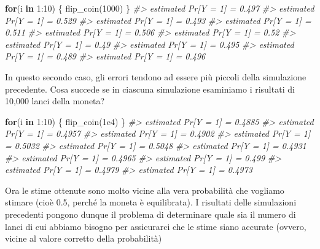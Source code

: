 \documentclass[
  11pt,
]{krantz}
\makeatletter
\newenvironment{Shaded}{\begin{snugshade}}{\end{snugshade}}
\newcommand{\CommentTok}[1]{\textcolor[rgb]{0.37,0.37,0.37}{\textit{#1}}}
\newcommand{\ControlFlowTok}[1]{\textcolor[rgb]{0.27,0.27,0.27}{\textbf{#1}}}
\newcommand{\DecValTok}[1]{\textcolor[rgb]{0.06,0.06,0.06}{#1}}
\newcommand{\FloatTok}[1]{\textcolor[rgb]{0.06,0.06,0.06}{#1}}
\newcommand{\FunctionTok}[1]{\textcolor[rgb]{0,0,0}{#1}}
\newcommand{\NormalTok}[1]{#1}
\newcommand{\SpecialCharTok}[1]{\textcolor[rgb]{0,0,0}{#1}}
\newenvironment{kframe}{%
\medskip{}
\setlength{\fboxsep}{.8em}
 \def\at@end@of@kframe{}%
 \ifinner\ifhmode%
  \def\at@end@of@kframe{\end{minipage}}%
  \begin{minipage}{\columnwidth}%
 \fi\fi%
 \def\FrameCommand##1{\hskip\@totalleftmargin \hskip-\fboxsep
 \colorbox{shadecolor}{##1}\hskip-\fboxsep
     \hskip-\linewidth \hskip-\@totalleftmargin \hskip\columnwidth}%
 \MakeFramed {\advance\hsize-\width
   \@totalleftmargin\z@ \linewidth\hsize
   \@setminipage}}%
 {\par\unskip\endMakeFramed%
 \at@end@of@kframe}
\renewenvironment{Shaded}{\begin{kframe}}{\end{kframe}}
\theoremstyle{definition}
\theoremstyle{definition}
\theoremstyle{definition}
\theoremstyle{definition}
\theoremstyle{remark}
\makeatother
\begin{document}
\begin{Shaded}
\begin{Highlighting}[]
\ControlFlowTok{for}\NormalTok{(i }\ControlFlowTok{in} \DecValTok{1}\SpecialCharTok{:}\DecValTok{10}\NormalTok{) \{}
  \FunctionTok{flip\_coin}\NormalTok{(}\DecValTok{1000}\NormalTok{)}
\NormalTok{\}}
\CommentTok{\#\textgreater{} estimated Pr[Y = 1] = 0.497 }
\CommentTok{\#\textgreater{} estimated Pr[Y = 1] = 0.529 }
\CommentTok{\#\textgreater{} estimated Pr[Y = 1] = 0.493 }
\CommentTok{\#\textgreater{} estimated Pr[Y = 1] = 0.511 }
\CommentTok{\#\textgreater{} estimated Pr[Y = 1] = 0.506 }
\CommentTok{\#\textgreater{} estimated Pr[Y = 1] = 0.52 }
\CommentTok{\#\textgreater{} estimated Pr[Y = 1] = 0.49 }
\CommentTok{\#\textgreater{} estimated Pr[Y = 1] = 0.495 }
\CommentTok{\#\textgreater{} estimated Pr[Y = 1] = 0.489 }
\CommentTok{\#\textgreater{} estimated Pr[Y = 1] = 0.496}
\end{Highlighting}
\end{Shaded}

In questo secondo caso, gli errori tendono ad essere più piccoli della simulazione precedente. Cosa succede se in ciascuna simulazione esaminiamo i risultati di 10,000 lanci della moneta?

\begin{Shaded}
\begin{Highlighting}[]
\ControlFlowTok{for}\NormalTok{(i }\ControlFlowTok{in} \DecValTok{1}\SpecialCharTok{:}\DecValTok{10}\NormalTok{) \{}
  \FunctionTok{flip\_coin}\NormalTok{(}\FloatTok{1e4}\NormalTok{)}
\NormalTok{\}}
\CommentTok{\#\textgreater{} estimated Pr[Y = 1] = 0.4885 }
\CommentTok{\#\textgreater{} estimated Pr[Y = 1] = 0.4957 }
\CommentTok{\#\textgreater{} estimated Pr[Y = 1] = 0.4902 }
\CommentTok{\#\textgreater{} estimated Pr[Y = 1] = 0.5032 }
\CommentTok{\#\textgreater{} estimated Pr[Y = 1] = 0.5048 }
\CommentTok{\#\textgreater{} estimated Pr[Y = 1] = 0.4931 }
\CommentTok{\#\textgreater{} estimated Pr[Y = 1] = 0.4965 }
\CommentTok{\#\textgreater{} estimated Pr[Y = 1] = 0.499 }
\CommentTok{\#\textgreater{} estimated Pr[Y = 1] = 0.4979 }
\CommentTok{\#\textgreater{} estimated Pr[Y = 1] = 0.4973}
\end{Highlighting}
\end{Shaded}

Ora le stime ottenute sono molto vicine alla vera probabilità che vogliamo stimare (cioè 0.5, perché la moneta è equilibrata). I risultati delle simulazioni precedenti pongono dunque il problema di determinare quale sia il numero di lanci di cui abbiamo bisogno per assicurarci che le stime siano accurate (ovvero, vicine al valore corretto della probabilità)
\end{document}
